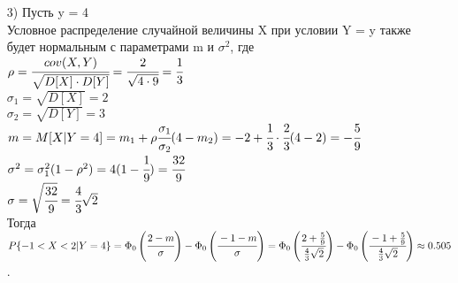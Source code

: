 \begin{enumerate}
	\item[3)] Пусть y = 4\\
	Условное распределение случайной величины X при условии Y = y также будет нормальным с параметрами m и $\sigma^2$, где\\
	$\rho = \cfrac{cov(X, Y)}{\sqrt{D[X] \cdot D[Y]}} = \cfrac{2}{\sqrt{4 \cdot 9}} = \cfrac13$\\
	$\sigma_1 = \sqrt{D[X]} = 2$\\
	$\sigma_2 = \sqrt{D[Y]} = 3$\\
	$m = M[X|Y = 4] = m_1 + \rho \cfrac{\sigma_1}{\sigma_2} (4 - m_2) = -2 + \cfrac13 \cdot \cfrac23 (4 - 2) = - \cfrac59$\\
	$\sigma^2 = \sigma_1^2 (1 - \rho^2) = 4(1 - \cfrac19) = \cfrac{32}9$\\
	$\sigma = \sqrt{\cfrac{32}9} = \cfrac43 \sqrt{2}$\\
	Тогда\\
	$P\{-1 < X < 2|Y = 4\} = \Phi_0 \left(\cfrac{2 - m}{\sigma}\right) - \Phi_0 \left(\cfrac{-1 - m}{\sigma}\right) = \Phi_0 \left(\cfrac{2 + \frac59}{\frac43 \sqrt{2}}\right) - \Phi_0 \left(\cfrac{-1 + \frac59}{\frac43 \sqrt{2}}\right) \approx 0.505$.
\end{enumerate}






















